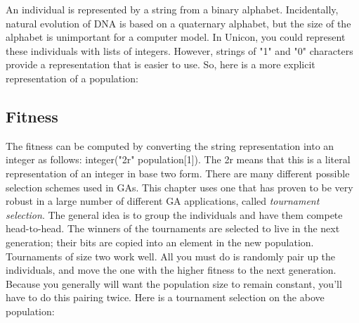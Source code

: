 An individual is represented by a string from a binary alphabet.
Incidentally, natural evolution of DNA is based on a quaternary
alphabet, but the size of the alphabet is unimportant for a computer
model. In Unicon, you could represent these individuals with lists of
integers. However, strings of \textsf{"1"}
and \textsf{"0"} characters provide a
representation that is easier to use. So, here is a more explicit
representation of a population:


\subsection{Fitness}

The fitness can be computed by converting the string representation into
an integer as follows: \textsf{integer("2r"
{\textbar}{\textbar} population[1])}. The \textsf{2r} means that this
is a literal representation of an integer in base two form. There are
many different possible selection schemes used in GAs. This chapter
uses one that has proven to be very robust in a large number of
different GA applications, called \textit{tournament selection}. The
general idea is to group the individuals and have them compete
head-to-head. The winners of the tournaments are selected to live in
the next generation; their bits are copied into an element in the new
population. Tournaments of size two work well. All you must do is
randomly pair up the individuals, and move the one with the higher
fitness to the next generation. Because you generally will want the
population size to remain constant, you'll have to do
this pairing twice. Here is a tournament selection on the above
population:


